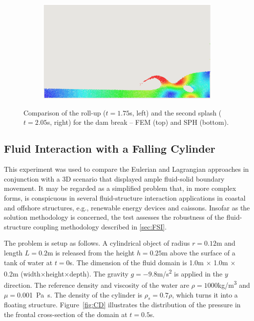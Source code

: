 \documentclass[final,3p,times]{elsarticle}
\begin{document}
\begin{figure}[H]
\begin{subfigure}{0.4\columnwidth}
	\end{subfigure}
	\begin{subfigure}{0.4\columnwidth}
		\centering
		\includegraphics[width=1.0\textwidth]{Images/DB_SPH_2.png}
	\end{subfigure}
	\caption{Comparison of the roll-up ($t=1.75$\si{s}, left) and the second splash ($t=2.05$\si{s}, right) for the dam break -- FEM (top) and SPH (bottom).}	
    \label{fig:db_charac}
\end{figure}

\subsection{Fluid Interaction with a Falling Cylinder}
This experiment was used to compare the Eulerian and Lagrangian approaches in conjunction with a 3D scenario that displayed ample fluid-solid boundary movement. It may be regarded as a simplified problem that, in more complex forms, is conspicuous in several fluid-structure interaction applications in coastal and offshore structures, e.g., renewable energy devices and caissons. Insofar as the solution methodology is concerned, the test assesses the robustness of the fluid-structure coupling methodology described in \ref{sec:FSI}. 

The problem is setup as follows. A cylindrical object of radius $r=0.12$\si{m} and length $L=0.2$\si{m} is released from the height $h=0.25$\si{m} above the surface of a tank of water at $t=0$\si{s}. The dimension of the fluid domain is 1.0\si{m} $\times$ 1.0\si{m} $\times$ 0.2\si{m} (width$\times$height$\times$depth). The gravity $g=-9.8$\si{m/s^2} is applied in the $y$ direction. The reference density and viscosity of the water are $\rho=1000$\si{kg/m^3} and $\mu=$\SI{0.001}{Pa.s}. The density of the cylinder is $\rho_s=0.7\rho$, which turns it into a floating structure. Figure~\ref{fig:CD} illustrates the distribution of the pressure in the frontal cross-section of the domain at $t=0.5$\si{s}. 
\end{document}
